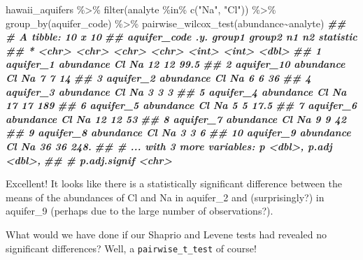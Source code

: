\documentclass[
]{krantz}
\newenvironment{Shaded}{\begin{snugshade}}{\end{snugshade}}
\newcommand{\DocumentationTok}[1]{\textcolor[rgb]{0.56,0.35,0.01}{\textbf{\textit{#1}}}}
\newcommand{\FunctionTok}[1]{\textcolor[rgb]{0.00,0.00,0.00}{#1}}
\newcommand{\NormalTok}[1]{#1}
\newcommand{\SpecialCharTok}[1]{\textcolor[rgb]{0.00,0.00,0.00}{#1}}
\newcommand{\StringTok}[1]{\textcolor[rgb]{0.31,0.60,0.02}{#1}}
\begin{document}
\begin{Shaded}
\begin{Highlighting}[]
\NormalTok{hawaii\_aquifers }\SpecialCharTok{\%\textgreater{}\%}
  \FunctionTok{filter}\NormalTok{(analyte }\SpecialCharTok{\%in\%} \FunctionTok{c}\NormalTok{(}\StringTok{"Na"}\NormalTok{, }\StringTok{"Cl"}\NormalTok{)) }\SpecialCharTok{\%\textgreater{}\%}
  \FunctionTok{group\_by}\NormalTok{(aquifer\_code) }\SpecialCharTok{\%\textgreater{}\%}
  \FunctionTok{pairwise\_wilcox\_test}\NormalTok{(abundance}\SpecialCharTok{\textasciitilde{}}\NormalTok{analyte)}
\DocumentationTok{\#\# \# A tibble: 10 x 10}
\DocumentationTok{\#\#    aquifer\_code .y.       group1 group2    n1    n2 statistic}
\DocumentationTok{\#\#  * \textless{}chr\textgreater{}        \textless{}chr\textgreater{}     \textless{}chr\textgreater{}  \textless{}chr\textgreater{}  \textless{}int\textgreater{} \textless{}int\textgreater{}     \textless{}dbl\textgreater{}}
\DocumentationTok{\#\#  1 aquifer\_1    abundance Cl     Na        12    12      99.5}
\DocumentationTok{\#\#  2 aquifer\_10   abundance Cl     Na         7     7      14  }
\DocumentationTok{\#\#  3 aquifer\_2    abundance Cl     Na         6     6      36  }
\DocumentationTok{\#\#  4 aquifer\_3    abundance Cl     Na         3     3       3  }
\DocumentationTok{\#\#  5 aquifer\_4    abundance Cl     Na        17    17     189  }
\DocumentationTok{\#\#  6 aquifer\_5    abundance Cl     Na         5     5      17.5}
\DocumentationTok{\#\#  7 aquifer\_6    abundance Cl     Na        12    12      53  }
\DocumentationTok{\#\#  8 aquifer\_7    abundance Cl     Na         9     9      42  }
\DocumentationTok{\#\#  9 aquifer\_8    abundance Cl     Na         3     3       6  }
\DocumentationTok{\#\# 10 aquifer\_9    abundance Cl     Na        36    36     248. }
\DocumentationTok{\#\# \# ... with 3 more variables: p \textless{}dbl\textgreater{}, p.adj \textless{}dbl\textgreater{},}
\DocumentationTok{\#\# \#   p.adj.signif \textless{}chr\textgreater{}}
\end{Highlighting}
\end{Shaded}

Excellent! It looks like there is a statistically significant difference between the means of the abundances of Cl and Na in aquifer\_2 and (surprisingly?) in aquifer\_9 (perhaps due to the large number of observations?).

What would we have done if our Shaprio and Levene tests had revealed no significant differences? Well, a \texttt{pairwise\_t\_test} of course!
\end{document}
